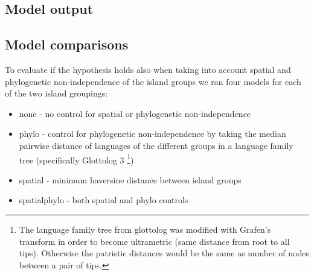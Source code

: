 \documentclass[unnumsec,webpdf,modern,medium]{oup-authoring-template}
\begin{document}


\newpage
\subsection{Model output}











\FloatBarrier
\newpage
\subsection{Model comparisons}
\label{appendix_model_fit_scores}
To evaluate if the hypothesis holds also when taking into account spatial and phylogenetic non-independence of the island groups we ran four models for each of the two island groupings:

\begin{itemize}

    \item none - no control for spatial or phylogenetic non-independence
    \item phylo - control for phylogenetic non-independence by taking the median pairwise distance of languages of the different groups in a language family tree (specifically Glottolog 3 \citet{glottolog3}\footnote{The language family tree from glottolog was modified with Grafen's transform in order to become ultrametric (same distance from root to all tips). Otherwise the patristic distances would be the same as number of nodes between a pair of tips.})
    \item spatial - minimum haversine distance between island groups
    \item spatialphylo - both spatial and phylo controls
    
\end{itemize}
\end{document}
